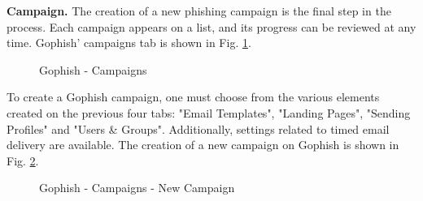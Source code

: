 \documentclass[a4paper]{article}
\begin{document}
\noindent
\textbf{Campaign.} The creation of a new phishing campaign is the final step in the process. Each campaign appears on a list, and its progress can be reviewed at any time. Gophish' campaigns tab is shown in Fig. \ref{gop-cpgn}.

\begin{figure}[H]
	\centering
	\caption{Gophish - Campaigns}
	\label{gop-cpgn}
\end{figure}

\noindent
To create a Gophish campaign, one must choose from the various elements created on the previous four tabs: "Email Templates", "Landing Pages", "Sending Profiles" and "Users \& Groups". Additionally, settings related to timed email delivery are available. The creation of a new campaign on Gophish is shown in Fig. \ref{gop-cpgnnc}.

\begin{figure}[H]
	\centering
	\caption{Gophish - Campaigns - New Campaign}
	\label{gop-cpgnnc}
\end{figure}
\end{document}
